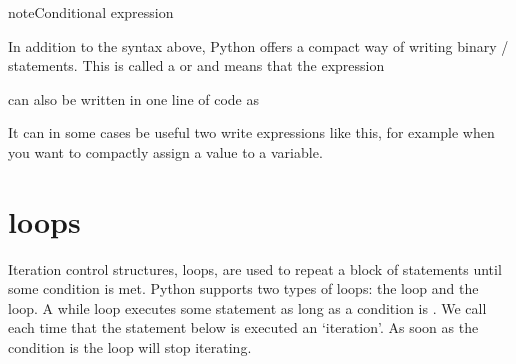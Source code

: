 \documentclass[letterpaper,10pt,english]{jupyterBook}
\begin{document}
\begin{sphinxadmonition}{note}{Conditional expression}

\sphinxAtStartPar
In addition to the syntax above, Python offers a compact way of writing binary / statements. This is called a  or  and means that the expression

\begin{sphinxVerbatim}[commandchars=\\\{\}]
   
\end{sphinxVerbatim}

\sphinxAtStartPar
can also be written in one line of code as

\begin{sphinxVerbatim}[commandchars=\\\{\}]
      
\end{sphinxVerbatim}

\sphinxAtStartPar
It can in some cases be useful two write expressions like this, for example when you want to compactly assign a value to a variable.

\begin{sphinxVerbatim}[commandchars=\\\{\}]
      
\end{sphinxVerbatim}
\end{sphinxadmonition}


\section{ loops}
\label{\detokenize{notebooks/03_ControlStructures/03_ControlStructures_student:while-loops}}
\sphinxAtStartPar
Iteration control structures, loops, are used to repeat a block of statements until some condition is
met. Python supports two types of loops: the \sphinxhyphen{}loop and the \sphinxhyphen{}loop. A while loop executes some statement as long as a condition is . We call each time that the statement below  is executed an ‘iteration’. As soon as the condition is  the loop will stop iterating.
\end{document}
